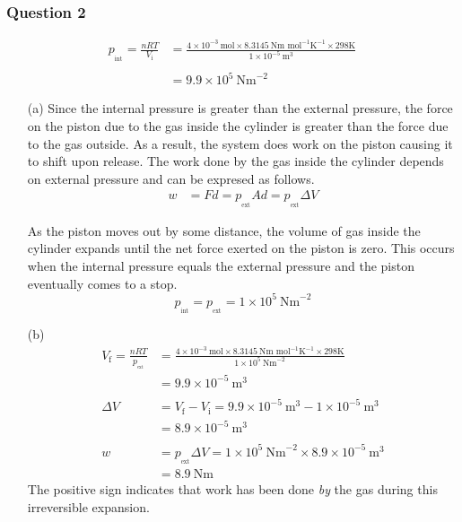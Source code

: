 \documentclass[11pt,a4paper]{article}
\begin{document}
\subsubsection*{Question 2}
	\begin{align*}
		p_{_{\text{int}}}= \frac{nRT}{V_{\text{i}}} &= \frac{4 \times 10^{-3} \ \text{mol} \times 8.3145 \ \text{Nm mol}^{-1} \text{K}^{-1} \times 298 \text{K}}{1 \times 10^{-5} \ 			\text{m}^3} \\
		\\
		&= 9.9 \times 10^5 \ \text{Nm}^{-2}
	\end{align*}
	\begin{enumerate}
		\item[(a)] 
			Since the internal pressure is greater than the external pressure, the force on the piston due to the gas inside the cylinder is greater than the force due to the gas 					outside. As a result, the system does work on the piston causing it to shift upon release. The work done by the gas inside the cylinder depends on external pressure and 				can be expresed as follows.
			\begin{align*}
				w &= Fd = p_{_{\text{ext}}}Ad = p_{_{\text{ext}}} \Delta V
			\end{align*}

			As the piston moves out by some distance, the volume of gas inside the cylinder expands until the net force exerted on the piston is zero. 
			This occurs when the internal pressure equals the external pressure and the piston eventually comes to a stop.
                        $$p_{_{\text{int}}} = p_{_{\text{ext}}} = 1 \times 10^{5} \ \text{Nm}^{-2}$$
		
		\item[(b)]
			\begin{align*}
				V_{\text{f}}=\frac{nRT}{p_{_{\text{ext}}}} &= \frac{4 \times 10^{-3} \ \text{mol} \times 8.3145 \ \text{Nm mol}^{-1} \text{K}^{-1} \times 298 \text{K}}
				{1 \times 10^{5} \ \text{Nm}^{-2}} \\
				&= 9.9 \times 10^{-5} \ \text{m}^{3} \\
				\\
				\Delta V &=  V_{\text{f}} - V_{\text{i}} =  9.9 \times 10^{-5}  \ \text{m}^{3} -  1 \times 10^{-5} \ \text{m}^3 \\
				&= 8.9 \times 10^{-5} \ \text{m}^3 \\
				\\
				w &=  p_{_{\text{ext}}} \Delta V =  1 \times 10^{5} \ \text{Nm}^{-2} \times 8.9 \times 10^{-5} \ \text{m}^3 \\
				&= 8.9 \ \text{Nm}
			\end{align*}
			The positive sign indicates that work has been done \emph{by} the gas during this irreversible expansion. \\


\end{enumerate}
\end{document}
